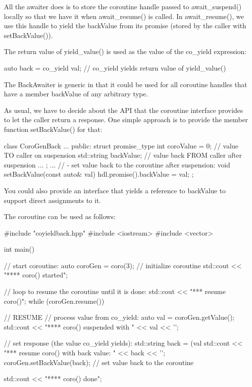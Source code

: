 All the awaiter does is to store the coroutine handle passed to await\_suspend() locally so that we have it when await\_resume() is called. In await\_resume(), we use this handle to yield the backValue from its promise (stored by the caller with setBackValue()).

The return value of yield\_value() is used as the value of the co\_yield expression:

\begin{cpp}
auto back = co_yield val; // co_yield yields return value of yield_value()
\end{cpp}

The BackAwaiter is generic in that it could be used for all coroutine handles that have a member backValue of any arbitrary type.


As usual, we have to decide about the API that the coroutine interface provides to let the caller return a response. One simple approach is to provide the member function setBackValue() for that:


\begin{cpp}
class CoroGenBack {
	...
	public:
	struct promise_type {
		int coroValue = 0; // value TO caller on suspension
		std::string backValue; // value back FROM caller after suspension
		...
	};
	...
	// - set value back to the coroutine after suspension:
	void setBackValue(const auto& val) {
		hdl.promise().backValue = val;
	}
};
\end{cpp}

You could also provide an interface that yields a reference to backValue to support direct assignments to it.


The coroutine can be used as follows:


\begin{cpp}
#include "coyieldback.hpp"
#include <iostream>
#include <vector>

int main()
{
	// start coroutine:
	auto coroGen = coro(3); // initialize coroutine
	std::cout << "**** coro() started\n";
	
	// loop to resume the coroutine until it is done:
	std::cout << "\n**** resume coro()\n";
	while (coroGen.resume()) { // RESUME
		// process value from co_yield:
		auto val = coroGen.getValue();
		std::cout << "**** coro() suspended with " << val << '\n';
		
		// set response (the value co_yield yields):
		std::string back = (val %
		std::cout << "\n**** resume coro() with back value: " << back << '\n';
		coroGen.setBackValue(back); // set value back to the coroutine
	}
	
	std::cout << "**** coro() done\n";
}
\end{cpp}

